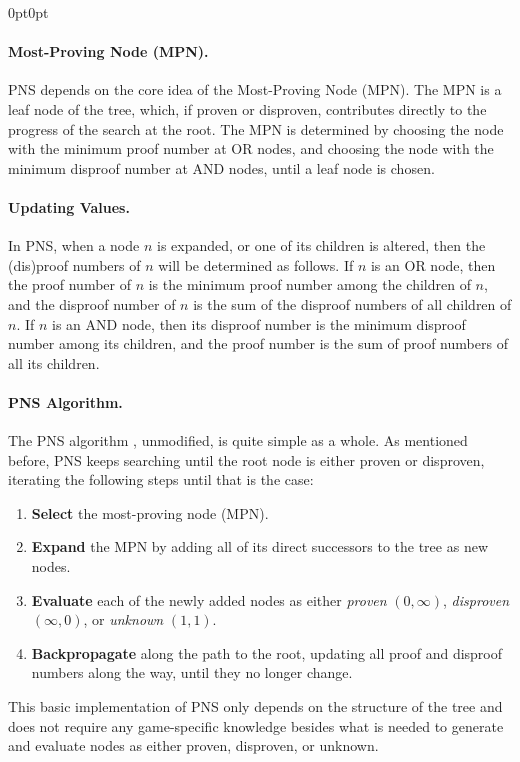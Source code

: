 \begin{adjustwidth}{0pt}{0pt}
\paragraph{Most-Proving Node (MPN).}
PNS depends on the core idea of the Most-Proving Node (MPN). The MPN is a leaf node of the tree, which, if proven or disproven, contributes directly to the progress of the search at the root.
The MPN is determined by choosing the node with the minimum proof number at OR nodes, and choosing the node with the minimum disproof number at AND nodes, until a leaf node is chosen.

\paragraph{Updating Values.}
In PNS, when a node $n$ is expanded, or one of its children is altered, then the (dis)proof numbers of $n$ will be determined as follows. If $n$ is an OR node, then the proof number of $n$ is the minimum proof number among the children of $n$, and the disproof number of $n$ is the sum of the disproof numbers of all children of $n$. If $n$ is an AND node, then its disproof number is the minimum disproof number among its children, and the proof number is the sum of proof numbers of all its children.

\paragraph{PNS Algorithm.}
The PNS algorithm \cite{Allis1994}, unmodified, is quite simple as a whole. As mentioned before, PNS keeps searching until the root node is either proven or disproven, iterating the following steps until that is the case:
\begin{enumerate}
    \item \textbf{Select} the most-proving node (MPN).
    \item \textbf{Expand} the MPN by adding all of its direct successors to the tree as new nodes.
    \item \textbf{Evaluate} each of the newly added nodes as either \textit{proven} $\left(0,\infty\right)$, \textit{disproven} $\left(\infty,0\right)$, or \textit{unknown} $\left(1,1\right)$.
    \item \textbf{Backpropagate} along the path to the root, updating all proof and disproof numbers along the way, until they no longer change.
\end{enumerate}
This basic implementation of PNS only depends on the structure of the tree and does not require any game-specific knowledge besides what is needed to generate and evaluate nodes as either proven, disproven, or unknown.


\end{adjustwidth}
